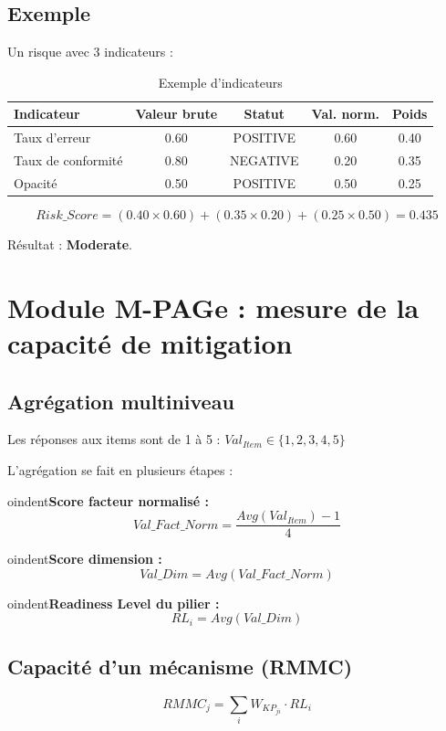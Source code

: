 \subsection{Exemple}
Un risque avec 3 indicateurs :

\begin{table}[h!]
\centering
\renewcommand{\arraystretch}{1.3}
\begin{tabular}{@{}lcccc@{}}
\hline
\textbf{Indicateur} & \textbf{Valeur brute} & \textbf{Statut} & \textbf{Val. norm.} & \textbf{Poids} \\
\hline
Taux d'erreur & 0.60 & POSITIVE & 0.60 & 0.40 \\
Taux de conformité & 0.80 & NEGATIVE & 0.20 & 0.35 \\
Opacité & 0.50 & POSITIVE & 0.50 & 0.25 \\
\hline
\end{tabular}
\caption{Exemple d'indicateurs}
\end{table}

$$
Risk\_Score = (0.40 \times 0.60) + (0.35 \times 0.20) + (0.25 \times 0.50) = 0.435
$$

Résultat : \textbf{Moderate}.

\section{Module M-PAGe : mesure de la capacité de mitigation}

\subsection{Agrégation multiniveau}
Les réponses aux items sont de 1 à 5 : $Val_{Item} \in \{1, 2, 3, 4, 5\}$

L'agrégation se fait en plusieurs étapes :

\vspace{0.3cm}

oindent\textbf{Score facteur normalisé :}
$$
Val\_Fact\_Norm = \frac{Avg(Val_{Item}) - 1}{4}
$$

oindent\textbf{Score dimension :}
$$
Val\_Dim = Avg(Val\_Fact\_Norm)
$$

oindent\textbf{Readiness Level du pilier :}
$$
RL_i = Avg(Val\_Dim)
$$

\subsection{Capacité d'un mécanisme (RMMC)}
$$
RMMC_j = \sum_{i} W_{KP_{ji}} \cdot RL_i
$$

